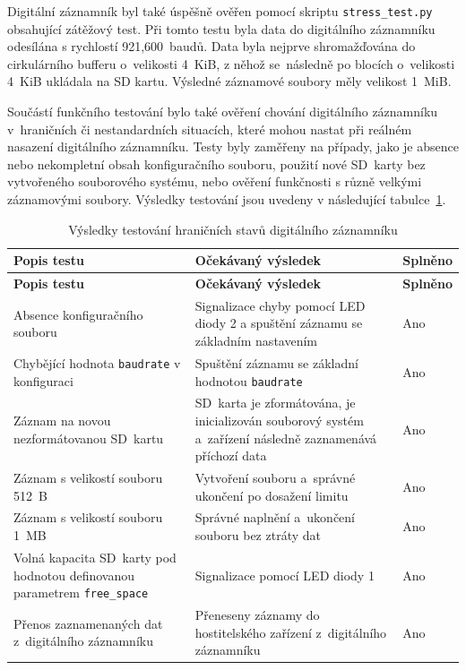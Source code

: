 Digitální záznamník byl také úspěšně ověřen pomocí skriptu \texttt{stress\_test.py} obsahující zátěžový test. Při tomto testu byla data do digitálního záznamníku odesílána s rychlostí 921,600~baudů. Data byla nejprve shromažďována do cirkulárního bufferu o~velikosti 4~KiB, z něhož se~následně po blocích o~velikosti 4~KiB ukládala na SD kartu. Výsledné záznamové soubory měly velikost 1~MiB.

Součástí funkčního testování bylo také ověření chování digitálního záznamníku v~hraničních
či nestandardních situacích, které mohou nastat při reálném nasazení digitálního
záznamníku. Testy byly zaměřeny na případy, jako je absence nebo nekompletní obsah konfiguračního
souboru, použití nové SD~karty bez vytvořeného souborového systému, nebo
ověření funkčnosti s různě velkými záznamovými soubory. Výsledky testování jsou uvedeny
v následující tabulce~\ref{tab:test-extremes}.

\begin{longtable}{|p{6cm}|p{5cm}|p{2.5cm}|}
    \caption{Výsledky testování hraničních stavů digitálního záznamníku}
    \label{tab:test-extremes} \\
    \hline
    \textbf{Popis testu} & \textbf{Očekávaný výsledek} & \textbf{Splněno} \\
    \hline
    \endfirsthead

    \hline
    \textbf{Popis testu} & \textbf{Očekávaný výsledek} & \textbf{Splněno} \\
    \hline
    \endhead

    \hline
    \endfoot

    \hline
    \endlastfoot

    Absence konfiguračního souboru & Signalizace chyby pomocí LED diody 2 a spuštění záznamu se základním nastavením & Ano \\
    \hline
    Chybějící hodnota \texttt{baudrate} v konfiguraci & Spuštění záznamu se základní hodnotou \texttt{baudrate} & Ano \\
    \hline
    Záznam na novou nezformátovanou SD~kartu & SD~karta je zformátována, je inicializován souborový systém a~zařízení následně zaznamenává příchozí data & Ano \\
    \hline
    Záznam s velikostí souboru 512~B & Vytvoření souboru a~správné ukončení po dosažení limitu & Ano \\
    \hline
    Záznam s velikostí souboru 1~MB & Správné naplnění a~ukončení souboru bez ztráty dat & Ano \\
    \hline
    Volná kapacita SD~karty pod hodnotou definovanou parametrem \texttt{free\_space} & Signalizace pomocí LED diody 1 & Ano \\
    \hline
    Přenos zaznamenaných dat z~digitálního záznamníku & Přeneseny záznamy do hostitelského zařízení z~digitálního záznamníku & Ano \\
    \hline
\end{longtable}

